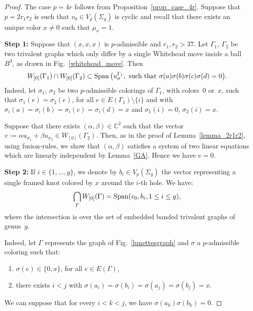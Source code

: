 \documentclass[pdftex]{sigma}
\numberwithin{equation}{section}
\begin{document}
\begin{proof}The case $p=4r$ follows from Proposition~\ref{prop_case_4r}. Suppose that $p=2r_1r_2$ is such that $v_0\in V_p(\Sigma_g)$ is cyclic and recall that there exists an unique color $x\neq 0$ such that $\mu_x=1$.

\textbf{Step 1:} Suppose that $(x,x,x)$ is $p$-admissible and $r_1,r_2>37$. Let $\Gamma_1$, $\Gamma_2$ be two trivalent graphs which only differ by a single Whitehead move inside a ball~$B^3$, as drawn in Fig.~\ref{whitehead_move}. Then
\begin{gather*} W_{[0]}(\Gamma_1)\cap W_{[0]}(\Gamma_2) \subset \Span \big( u_{\sigma}^{\Gamma_1}, \ \text{such that} \ \sigma(a)\sigma(b)\sigma(c)\sigma(d)=0 \big).\end{gather*}
Indeed, let $\sigma_1$, $\sigma_2$ be two $p$-admissible colorings of $\Gamma_1$, with colors~$0$ or~$x$, such that
$ \sigma_1(e) = \sigma_2(e)$, for all $e \in E(\Gamma_1)\setminus \{i \} $ and with $\sigma_i(a)=\sigma_i(b)=\sigma_i(c)=\sigma_i(d)=x$ and $\sigma_1(i)=0$, $\sigma_2(i)=x$.

Suppose that there exists $(\alpha, \beta) \in \mathbb{C}^2$ such that the vector $ v:= \alpha u_{\sigma_1} + \beta u_{\sigma_2} \in W_{[0]}(\Gamma_2)$. Then, as in the proof of Lemma~\ref{lemma_2r1r2}, using fusion-rules, we show that $(\alpha, \beta)$ satisfies a system of two linear equations which are linearly independent by Lemma~\ref{GA}. Hence we have $v=0$.

\textbf{Step 2:} If $i\in \{1,\ldots, g\}$, we denote by $b_i\in V_p(\Sigma_g)$ the vector representing a single framed knot colored by $x$ around the $i$-{th} hole. We have:
\begin{gather*} \bigcap_{\Gamma } W_{[0]}(\Gamma) = \operatorname{Span} (v_0, b_i, 1\leq i \leq g ),\end{gather*}
where the intersection is over the set of embedded banded trivalent graphs of genus~$g$.

Indeed, let $\Gamma$ represents the graph of Fig.~\ref{lunettesgraph} and $\sigma$ a $p$-admissible coloring such that:
\begin{enumerate}\itemsep=0pt
\item[1)] $\sigma(e) \in \{ 0, x \}$, for all $e\in E(\Gamma)$,
\item[2)] %
there exists $i<j$ with $\sigma(a_i)=\sigma(b_i)=\sigma(a_j)=\sigma(b_j)=x$.
\end{enumerate}

We can suppose that for every $i<k<j$, we have $\sigma(a_k)\sigma(b_k)=0$.


\end{proof}
\end{document}
